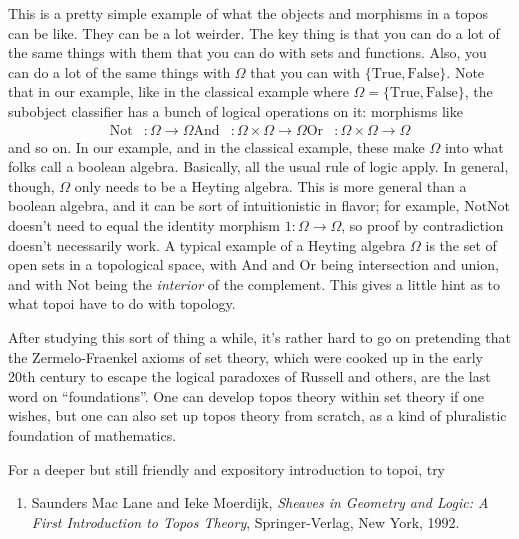 \documentclass{article}
\def\tightlist{}
\begin{document}
This is a pretty simple example of what the objects and morphisms in a
topos can be like. They can be a lot weirder. The key thing is that you
can do a lot of the same things with them that you can do with sets and
functions. Also, you can do a lot of the same things with \(\Omega\)
that you can with \(\{\mathrm{True}, \mathrm{False}\}\). Note that in
our example, like in the classical example where
\(\Omega = \{\mathrm{True}, \mathrm{False}\}\), the subobject classifier
has a bunch of logical operations on it: morphisms like \[
  \begin{aligned}
    \mathrm{Not}&\colon \Omega \to \Omega
    \mathrm{And}&\colon \Omega \times \Omega \to \Omega
    \mathrm{Or}&\colon \Omega \times \Omega \to \Omega
  \end{aligned}
\] and so on. In our example, and in the classical example, these make
\(\Omega\) into what folks call a boolean algebra. Basically, all the
usual rule of logic apply. In general, though, \(\Omega\) only needs to
be a Heyting algebra. This is more general than a boolean algebra, and
it can be sort of intuitionistic in flavor; for example,
\(\mathrm{Not} \mathrm{Not}\) doesn't need to equal the identity
morphism \(1\colon \Omega \to \Omega\), so proof by contradiction
doesn't necessarily work. A typical example of a Heyting algebra
\(\Omega\) is the set of open sets in a topological space, with
\(\mathrm{And}\) and \(\mathrm{Or}\) being intersection and union, and
with \(\mathrm{Not}\) being the \emph{interior} of the complement. This
gives a little hint as to what topoi have to do with topology.

After studying this sort of thing a while, it's rather hard to go on
pretending that the Zermelo-Fraenkel axioms of set theory, which were
cooked up in the early 20th century to escape the logical paradoxes of
Russell and others, are the last word on ``foundations''. One can
develop topos theory within set theory if one wishes, but one can also
set up topos theory from scratch, as a kind of pluralistic foundation of
mathematics.

For a deeper but still friendly and expository introduction to topoi,
try

\begin{enumerate}
\def\labelenumi{\arabic{enumi})}
\setcounter{enumi}{1}
\tightlist
\item
  Saunders Mac Lane and Ieke Moerdijk, \emph{Sheaves in Geometry and
  Logic: A First Introduction to Topos Theory}, Springer-Verlag, New
  York, 1992.
\end{enumerate}
\end{document}
